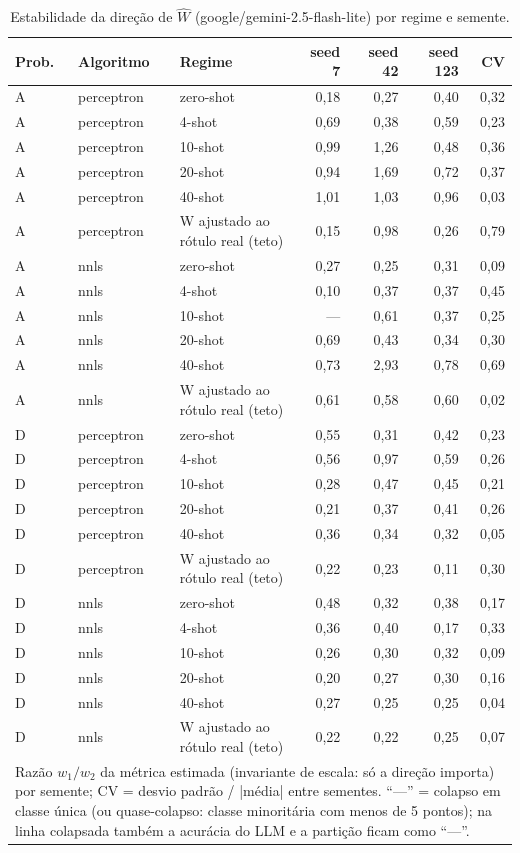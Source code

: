 \begin{table}[htbp]
\centering
\small
\caption{Estabilidade da direção de $\hat{W}$ (google/gemini-2.5-flash-lite) por regime e semente.}
\label{tab:T4_W_flashlite}
\begin{tabular}{lllrrrr}
\toprule
Prob. & Algoritmo & Regime & seed 7 & seed 42 & seed 123 & CV \\
\midrule
A & perceptron & zero-shot & 0,18 & 0,27 & 0,40 & 0,32 \\
A & perceptron & 4-shot & 0,69 & 0,38 & 0,59 & 0,23 \\
A & perceptron & 10-shot & 0,99 & 1,26 & 0,48 & 0,36 \\
A & perceptron & 20-shot & 0,94 & 1,69 & 0,72 & 0,37 \\
A & perceptron & 40-shot & 1,01 & 1,03 & 0,96 & 0,03 \\
A & perceptron & W ajustado ao rótulo real (teto) & 0,15 & 0,98 & 0,26 & 0,79 \\
\midrule
A & nnls & zero-shot & 0,27 & 0,25 & 0,31 & 0,09 \\
A & nnls & 4-shot & 0,10 & 0,37 & 0,37 & 0,45 \\
A & nnls & 10-shot & — & 0,61 & 0,37 & 0,25 \\
A & nnls & 20-shot & 0,69 & 0,43 & 0,34 & 0,30 \\
A & nnls & 40-shot & 0,73 & 2,93 & 0,78 & 0,69 \\
A & nnls & W ajustado ao rótulo real (teto) & 0,61 & 0,58 & 0,60 & 0,02 \\
\midrule
D & perceptron & zero-shot & 0,55 & 0,31 & 0,42 & 0,23 \\
D & perceptron & 4-shot & 0,56 & 0,97 & 0,59 & 0,26 \\
D & perceptron & 10-shot & 0,28 & 0,47 & 0,45 & 0,21 \\
D & perceptron & 20-shot & 0,21 & 0,37 & 0,41 & 0,26 \\
D & perceptron & 40-shot & 0,36 & 0,34 & 0,32 & 0,05 \\
D & perceptron & W ajustado ao rótulo real (teto) & 0,22 & 0,23 & 0,11 & 0,30 \\
\midrule
D & nnls & zero-shot & 0,48 & 0,32 & 0,38 & 0,17 \\
D & nnls & 4-shot & 0,36 & 0,40 & 0,17 & 0,33 \\
D & nnls & 10-shot & 0,26 & 0,30 & 0,32 & 0,09 \\
D & nnls & 20-shot & 0,20 & 0,27 & 0,30 & 0,16 \\
D & nnls & 40-shot & 0,27 & 0,25 & 0,25 & 0,04 \\
D & nnls & W ajustado ao rótulo real (teto) & 0,22 & 0,22 & 0,25 & 0,07 \\
\bottomrule
\multicolumn{7}{p{0.95\linewidth}}{\footnotesize Razão $w_1/w_2$ da métrica estimada (invariante de escala: só a direção importa) por semente; CV = desvio padrão / |média| entre sementes. ``—'' = colapso em classe única (ou quase-colapso: classe minoritária com menos de 5 pontos); na linha colapsada também a acurácia do LLM e a partição ficam como ``—''.} \\
\end{tabular}
\end{table}
